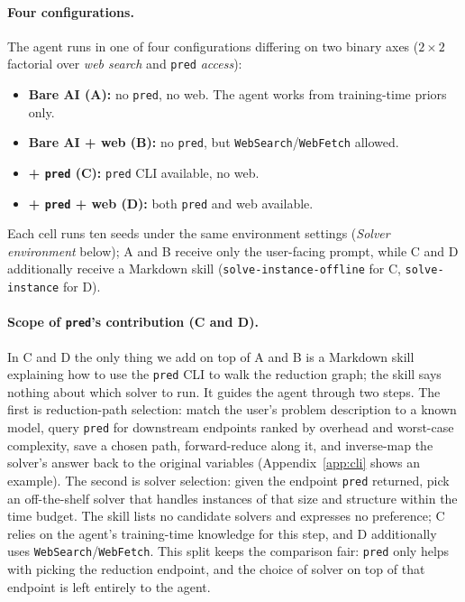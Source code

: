 \documentclass{article}
\begin{document}
\paragraph{Four configurations.}
The agent runs in one of four configurations differing on two binary axes ($2{\times}2$ factorial over \emph{web search} and \texttt{pred} \emph{access}):
\begin{itemize}
\item \textbf{Bare AI (A):} no \texttt{pred}, no web. The agent works from training-time priors only.
\item \textbf{Bare AI + web (B):} no \texttt{pred}, but \texttt{WebSearch}/\texttt{WebFetch} allowed.
\item \textbf{+ \texttt{pred} (C):} \texttt{pred} CLI available, no web.
\item \textbf{+ \texttt{pred} + web (D):} both \texttt{pred} and web available.
\end{itemize}
Each cell runs ten seeds under the same environment settings (\emph{Solver environment} below); A and B receive only the user-facing prompt, while C and D additionally receive a Markdown skill (\texttt{solve-instance-offline} for C, \texttt{solve-instance} for D).

\paragraph{Scope of \texttt{pred}'s contribution (C and D).}
In C and D the only thing we add on top of A and B is a Markdown skill explaining how to use the \texttt{pred} CLI to walk the reduction graph; the skill says nothing about which solver to run. It guides the agent through two steps. The first is reduction-path selection: match the user's problem description to a known model, query \texttt{pred} for downstream endpoints ranked by overhead and worst-case complexity, save a chosen path, forward-reduce along it, and inverse-map the solver's answer back to the original variables (Appendix~\ref{app:cli} shows an example). The second is solver selection: given the endpoint \texttt{pred} returned, pick an off-the-shelf solver that handles instances of that size and structure within the time budget. The skill lists no candidate solvers and expresses no preference; C relies on the agent's training-time knowledge for this step, and D additionally uses \texttt{WebSearch}/\texttt{WebFetch}. This split keeps the comparison fair: \texttt{pred} only helps with picking the reduction endpoint, and the choice of solver on top of that endpoint is left entirely to the agent.
\end{document}
